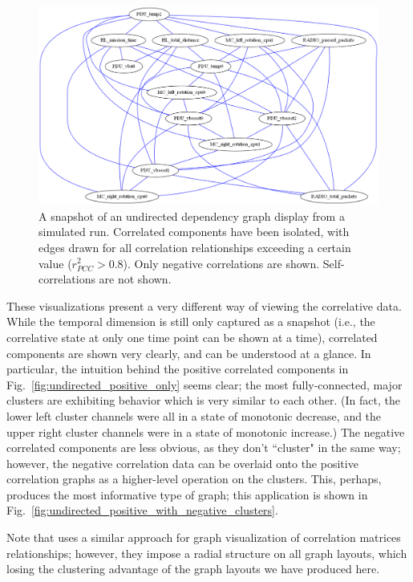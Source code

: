 \begin{figure}[h]
\centering
    \includegraphics[width=\columnwidth]{images/undirected_negative_only.png}
    \caption{A snapshot of an undirected dependency graph display from a simulated run. Correlated components have been isolated, with edges drawn for all correlation relationships exceeding a certain value ($r_{PCC}^{2} > 0.8$). Only negative correlations are shown. Self-correlations are not shown.}
    \label{fig:undirected_negative_only}
\end{figure}

These visualizations present a very different way of viewing the correlative data. While the temporal dimension is still only captured as a snapshot (i.e., the correlative state at only one time point can be shown at a time), correlated components are shown very clearly, and can be understood at a glance. In particular, the intuition behind the positive correlated components in Fig.~\ref{fig:undirected_positive_only} seems clear; the most fully-connected, major clusters are exhibiting behavior which is very similar to each other. (In fact, the lower left cluster channels were all in a state of monotonic decrease, and the upper right cluster channels were in a state of monotonic increase.) The negative correlated components are less obvious, as they don't ``cluster" in the same way; however, the negative correlation data can be overlaid onto the positive correlation graphs as a higher-level operation on the clusters. This, perhaps, produces the most informative type of graph; this application is shown in Fig.~\ref{fig:undirected_positive_with_negative_clusters}.

Note that \cite{yeh2007exploratory} uses a similar approach for graph visualization of correlation matrices relationships; however, they impose a radial structure on all graph layouts, which losing the clustering advantage of the graph layouts we have produced here.

